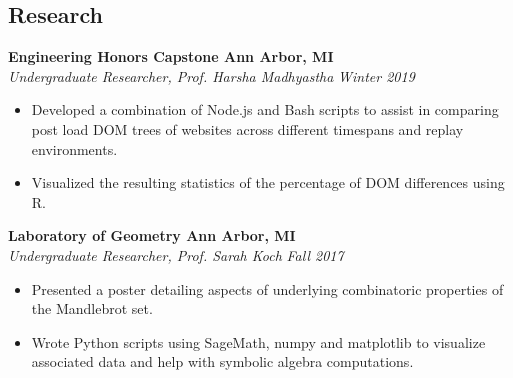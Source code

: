 \documentclass[margin,line]{resume}
\begin{document}
\begin{resume}
	\section{\mysidestyle Research}
	
	\textbf{Engineering Honors Capstone \href{https://github.com/jonathoma/js-correctness-checker}{\faGithub} \hfill Ann Arbor, MI} \vspace{1mm}\\\vspace{1mm}%
	\textsl{Undergraduate Researcher, Prof. Harsha Madhyastha} \hfill \textsl{Winter 2019}
	\begin{itemize}[leftmargin=4mm]
		\item Developed a combination of Node.js and Bash scripts to assist in comparing post load DOM trees of websites across different timespans and replay environments.
		\item Visualized the resulting statistics of the percentage of DOM differences using R.
	\end{itemize}
	\vspace{-1.5mm}
	
	\textbf{Laboratory of Geometry \href{https://github.com/jonathoma/LogM}{\faGithub} \hfill Ann Arbor, MI} \vspace{1mm}\\\vspace{1mm}%
	\textsl{Undergraduate Researcher, Prof. Sarah Koch} \hfill \textsl{Fall 2017}
	\begin{itemize}[leftmargin=4mm]
		\item Presented a poster detailing aspects of underlying combinatoric properties of the Mandlebrot set.
		\item Wrote Python scripts using SageMath, numpy and matplotlib to visualize associated data and help with symbolic algebra computations. 
	\end{itemize}
	

\end{resume}
\end{document}
